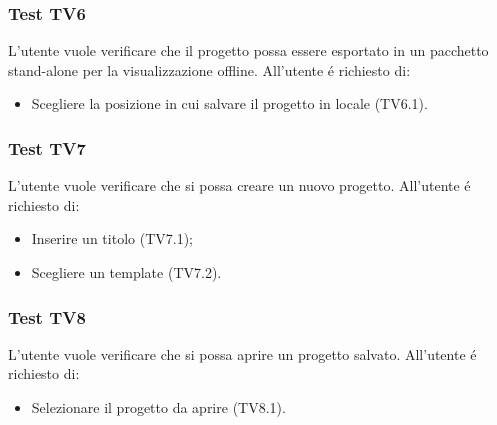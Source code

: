 \subsubsection{Test TV6}
L'utente vuole verificare che il progetto possa essere esportato in un pacchetto stand-alone per la visualizzazione offline. \newline
All'utente é richiesto di:
\begin{itemize}
	\item Scegliere la posizione in cui salvare il progetto in locale (TV6.1).
\end{itemize}

\subsubsection{Test TV7}
L'utente vuole verificare che si possa creare un nuovo progetto. \newline
All'utente é richiesto di:
\begin{itemize}
	\item Inserire un titolo (TV7.1);
	\item Scegliere un template (TV7.2).
\end{itemize}

\subsubsection{Test TV8}
L'utente vuole verificare che si possa aprire un progetto salvato. \newline
All'utente é richiesto di:
\begin{itemize}
	\item Selezionare il progetto da aprire (TV8.1).
\end{itemize}

